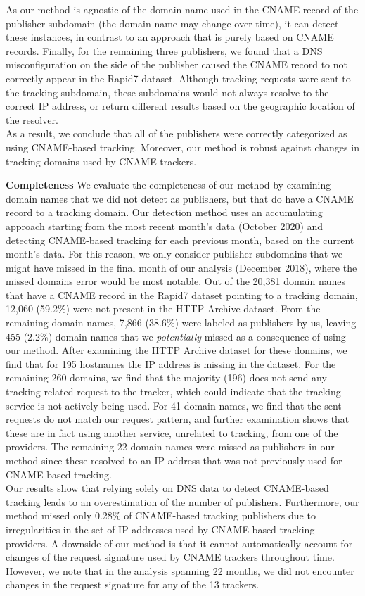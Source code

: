 As our method is agnostic of the domain name used in the CNAME record of the publisher subdomain (the domain name may change over time), it can detect these instances, in contrast to an approach that is purely based on CNAME records.
Finally, for the remaining three publishers, we found that a DNS misconfiguration on the side of the publisher caused the CNAME record to not correctly appear in the Rapid7 dataset.
Although tracking requests were sent to the tracking subdomain, these subdomains would not always resolve to the correct IP address, or return different results based on the geographic location of the resolver.\\
As a result, we conclude that all of the publishers were correctly categorized as using CNAME-based tracking.
Moreover, our method is robust against changes in tracking domains used by CNAME trackers. 


\textbf{Completeness}
We evaluate the completeness of our method by examining domain names that we did not detect as publishers, but that do have a CNAME record to a tracking domain.
Our detection method uses an accumulating approach starting from the most recent month's data (October 2020) and detecting CNAME-based tracking for each previous month, based on the current month's data.
For this reason, we only consider publisher subdomains that we might have missed in the final month of our analysis (December 2018), where the missed domains error would be most notable. 
Out of the 20,381 domain names that have a CNAME record in the Rapid7 dataset pointing to a tracking domain, 12,060 (59.2\%) were not present in the HTTP Archive dataset.
From the remaining domain names, 7,866 (38.6\%) were labeled as publishers by us, leaving 455 (2.2\%) domain names that we \emph{potentially} missed as a consequence of using our method.
After examining the HTTP Archive dataset for these domains, we find that for 195 hostnames the IP address is missing in the dataset.
For the remaining 260 domains, we find that the majority (196) does not send any tracking-related request to the tracker, which could indicate that the tracking service is not actively being used.
For 41 domain names, we find that the sent requests do not match our request pattern, and further examination shows that these are in fact using another service, unrelated to tracking, from one of the providers.
The remaining 22 domain names were missed as publishers in our method since these resolved to an IP address that was not previously used for CNAME-based tracking. \\
Our results show that relying solely on DNS data to detect CNAME-based tracking leads to an overestimation of the number of publishers.
Furthermore, our method missed only 0.28\% of CNAME-based tracking publishers due to irregularities in the set of IP addresses used by CNAME-based tracking providers.
A downside of our method is that it cannot automatically account for changes of the request signature used by CNAME trackers throughout time.
However, we note that in the analysis spanning 22 months, we did not encounter changes in the request signature for any of the 13 trackers.

